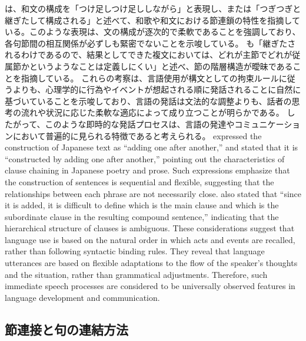 \documentclass[a4paper,xelatex,ja=standard]{bxjsarticle}
\begin{document}
\ifJPN
  \textcite{sakakura1975aj}は、和文の構成を「つけ足しつけ足ししながら」と表現し、また\textcite{komatu2003a}は「つぎつぎと継ぎたして構成される」と述べて、和歌や和文における節連鎖の特性を指摘している。このような表現は、文の構成が逐次的で柔軟であることを強調しており、各句節間の相互関係が必ずしも緊密でないことを示唆している。
  \textcite{kondo2005aj}も「継ぎたされるわけであるので、結果としてできた複文においては、どれが主節でどれが従属節かというようなことは定義しにくい」と述べ、節の階層構造が曖昧であることを指摘している。
  これらの考察は、言語使用が構文としての拘束ルールに従うよりも、心理学的に行為やイベントが想起される順に発話されることに自然に基づいていることを示唆しており、言語の発話は文法的な調整よりも、話者の思考の流れや状況に応じた柔軟な適応によって成り立つことが明らかである。
  したがって、このような即時的な発話プロセスは、言語の発達やコミュニケーションにおいて普遍的に見られる特徴であると考えられる。
\else
  \textcite{sakakura1975ae} expressed the construction of Japanese text as ``adding one after another,'' and \textcite{komatu2003ae} stated that it is ``constructed by adding one after another,'' pointing out the characteristics of clause chaining in Japanese poetry and prose. Such expressions emphasize that the construction of sentences is sequential and flexible, suggesting that the relationships between each phrase are not necessarily close. \textcite{kondo2005be} also stated that ``since it is added, it is difficult to define which is the main clause and which is the subordinate clause in the resulting compound sentence,'' indicating that the hierarchical structure of clauses is ambiguous. These considerations suggest that language use is based on the natural order in which acts and events are recalled, rather than following syntactic binding rules. They reveal that language utterances are based on flexible adaptations to the flow of the speaker's thoughts and the situation, rather than grammatical adjustments. Therefore, such immediate speech processes are considered to be universally observed features in language development and communication.
\fi

\ifJPN
  \subsection{節連接と句の連結方法}
\else
\end{document}
